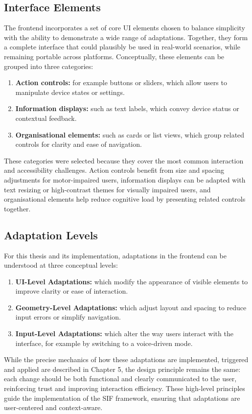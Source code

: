 \documentclass[openany]{book}
\begin{document}
\subsection{Interface Elements}
The frontend incorporates a set of core UI elements chosen to balance simplicity with the ability to demonstrate a wide range of adaptations. Together, they form a complete interface that could plausibly be used in real-world scenarios, while remaining portable across platforms. Conceptually, these elements can be grouped into three categories:
\begin{enumerate}
    \item \textbf{Action controls:} for example buttons or sliders, which allow users to manipulate device states or settings.
    \item \textbf{Information displays:} such as text labels, which convey device status or contextual feedback.
    \item \textbf{Organisational elements:} such as cards or list views, which group related controls for clarity and ease of navigation.
\end{enumerate}
These categories were selected because they cover the most common interaction and accessibility challenges. Action controls benefit from size and spacing adjustments for motor-impaired users, information displays can be adapted with text resizing or high-contrast themes for visually impaired users, and organisational elements help reduce cognitive load by presenting related controls together.

\subsection{Adaptation Levels}
For this thesis and its implementation, adaptations in the frontend can be understood at three conceptual levels:
\begin{enumerate}
    \item \textbf{UI-Level Adaptations:} which modify the appearance of visible elements to improve clarity or ease of interaction.
    \item \textbf{Geometry-Level Adaptations:} which adjust layout and spacing to reduce input errors or simplify navigation.
    \item \textbf{Input-Level Adaptations:} which alter the way users interact with the interface, for example by switching to a voice-driven mode.
\end{enumerate}
While the precise mechanics of how these adaptations are implemented, triggered and applied are described in Chapter 5, the design principle remains the same: each change should be both functional and clearly communicated to the user, reinforcing trust and improving interaction efficiency. These high-level principles guide the implementation of the SIF framework, ensuring that adaptations are user-centered and context-aware.
\end{document}
